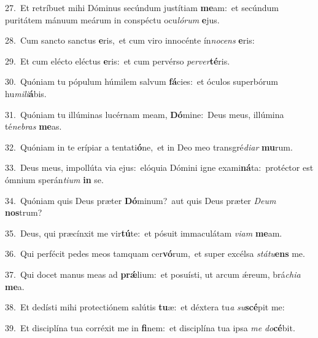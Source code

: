 {\numbfont\textcolor{\numbcolor}{27.}}~Et retríbuet mihi Dóminus secúndum justítiam \textbf{me}\-am:~\star et secúndum puritátem mánuum meárum in conspéctu ocu\-\textit{ló}\-\textit{rum} \textbf{e}\-jus.\par
{\numbfont\textcolor{\numbcolor}{28.}}~Cum sancto sanctus \textbf{e}\-ris,~\star et cum viro innocénte ín\-\textit{no}\-\textit{cens} \textbf{e}\-ris:\par
{\numbfont\textcolor{\numbcolor}{29.}}~Et cum elécto eléctus \textbf{e}\-ris:~\star et cum pervérso \textit{per}\-\textit{ver}\textbf{té}ris.\par
{\numbfont\textcolor{\numbcolor}{30.}}~Quóniam tu pópulum húmilem salvum \textbf{fá}\-cies:~\star et óculos superbórum hu\-\textit{mi}\-\textit{li}\textbf{á}bis.\par
{\numbfont\textcolor{\numbcolor}{31.}}~Quóniam tu illúminas lucérnam meam, \textbf{Dó}\-mine:~\star Deus meus, illúmina té\-\textit{ne}\-\textit{bras} \textbf{me}\-as.\par
{\numbfont\textcolor{\numbcolor}{32.}}~Quóniam in te erípiar a tentati\-\textbf{ó}\-ne,~\star et in Deo meo transgré\-\textit{di}\-\textit{ar} \textbf{mu}\-rum.\par
{\numbfont\textcolor{\numbcolor}{33.}}~Deus meus, impollúta via ejus:~\dagger elóquia Dómini igne exami\-\textbf{ná}\-ta:~\star protéctor est ómnium sperán\-\textit{ti}\-\textit{um} \textbf{in} se.\par
{\numbfont\textcolor{\numbcolor}{34.}}~Quóniam quis Deus præter \textbf{Dó}\-minum?~\star aut quis Deus præter \textit{De}\-\textit{um} \textbf{nos}\-trum?\par
{\numbfont\textcolor{\numbcolor}{35.}}~Deus, qui præcínxit me vir\-\textbf{tú}\-te:~\star et pósuit immaculátam \textit{vi}\-\textit{am} \textbf{me}\-am.\par
{\numbfont\textcolor{\numbcolor}{36.}}~Qui perfécit pedes meos tamquam cer\-\textbf{vó}\-rum,~\star et super excélsa \textit{stá}\-\textit{tu}\textbf{ens} me.\par
{\numbfont\textcolor{\numbcolor}{37.}}~Qui docet manus meas ad \textbf{prǽ}\-lium:~\star et posuísti, ut arcum ǽreum, brá\-\textit{chi}\-\textit{a} \textbf{me}\-a.\par
{\numbfont\textcolor{\numbcolor}{38.}}~Et dedísti mihi protectiónem salútis \textbf{tu}\-æ:~\star et déxtera tu\textit{a} \textit{su}\-\textbf{scé}pit me:\par
{\numbfont\textcolor{\numbcolor}{39.}}~Et disciplína tua corréxit me in \textbf{fi}\-nem:~\star et disciplína tua ipsa \textit{me} \textit{do}\-\textbf{cé}bit.\par
